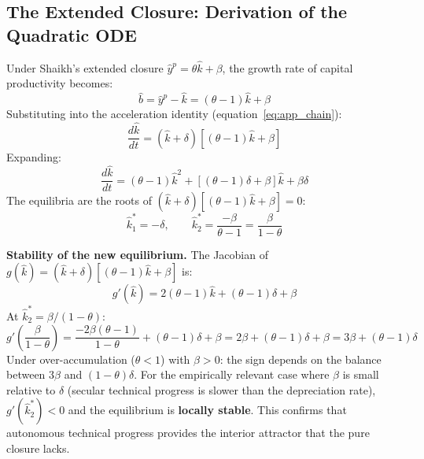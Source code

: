
\subsection{The Extended Closure: Derivation of the Quadratic ODE}
\label{app:extended_derivation}

Under Shaikh's extended closure $\hat{y}^p = \theta\hat{k} + \beta$, the growth rate of capital productivity becomes:
%
\begin{equation}\label{eq:app_bhat_extended}
	\hat{b} = \hat{y}^p - \hat{k} = (\theta - 1)\hat{k} + \beta
\end{equation}
%
Substituting into the acceleration identity (equation~\ref{eq:app_chain}):
%
\begin{equation}\label{eq:app_extended_ode}
	\frac{d\hat{k}}{dt} = (\hat{k} + \delta)\left[(\theta - 1)\hat{k} + \beta\right]
\end{equation}
%
Expanding:
%
\begin{equation}\label{eq:app_quadratic}
	\frac{d\hat{k}}{dt} = (\theta - 1)\hat{k}^2 + \left[(\theta - 1)\delta + \beta\right]\hat{k} + \beta\delta
\end{equation}
%
The equilibria are the roots of $(\hat{k} + \delta)[(\theta - 1)\hat{k} + \beta] = 0$:
%
\begin{equation}\label{eq:app_extended_roots}
	\hat{k}_1^* = -\delta, \qquad \hat{k}_2^* = \frac{-\beta}{\theta - 1} = \frac{\beta}{1 - \theta}
\end{equation}

\textbf{Stability of the new equilibrium.} The Jacobian of $g(\hat{k}) = (\hat{k}+\delta)[(\theta-1)\hat{k}+\beta]$ is:
%
\begin{equation}\label{eq:app_ext_jacobian}
	g'(\hat{k}) = 2(\theta - 1)\hat{k} + (\theta-1)\delta + \beta
\end{equation}
%
At $\hat{k}_2^* = \beta/(1 - \theta)$:
%
\begin{equation}
	g'\!\left(\frac{\beta}{1-\theta}\right) = \frac{-2\beta(\theta-1)}{1-\theta} + (\theta-1)\delta + \beta = 2\beta + (\theta-1)\delta + \beta = 3\beta + (\theta-1)\delta
\end{equation}
%
Under over-accumulation ($\theta < 1$) with $\beta > 0$: the sign depends on the balance between $3\beta$ and $(1-\theta)\delta$. For the empirically relevant case where $\beta$ is small relative to $\delta$ (secular technical progress is slower than the depreciation rate), $g'(\hat{k}_2^*) < 0$ and the equilibrium is \textbf{locally stable}. This confirms that autonomous technical progress provides the interior attractor that the pure closure lacks.

